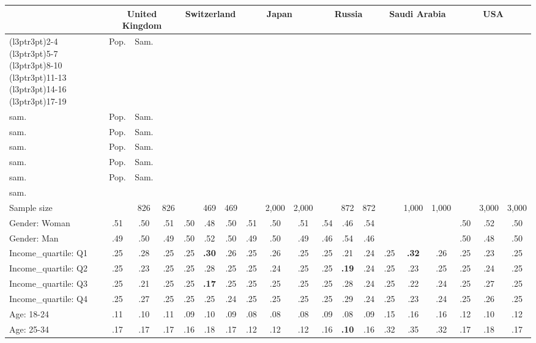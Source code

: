
\begin{tabular}[t]{lcccccccccccccccccc}
\toprule
\multicolumn{1}{c}{} & \multicolumn{3}{c}{United Kingdom} & \multicolumn{3}{c}{Switzerland} & \multicolumn{3}{c}{Japan} & \multicolumn{3}{c}{Russia} & \multicolumn{3}{c}{Saudi Arabia} & \multicolumn{3}{c}{USA} \\
\cmidrule(l{3pt}r{3pt}){2-4} \cmidrule(l{3pt}r{3pt}){5-7} \cmidrule(l{3pt}r{3pt}){8-10} \cmidrule(l{3pt}r{3pt}){11-13} \cmidrule(l{3pt}r{3pt}){14-16} \cmidrule(l{3pt}r{3pt}){17-19}
  & Pop. & Sam. & \makecell{Wght.\\sam.} & Pop. & Sam. & \makecell{Wght.\\sam.} & Pop. & Sam. & \makecell{Wght.\\sam.} & Pop. & Sam. & \makecell{Wght.\\sam.} & Pop. & Sam. & \makecell{Wght.\\sam.} & Pop. & Sam. & \makecell{Wght.\\sam.}\\
\midrule
Sample size &  & 826 & 826 &  & 469 & 469 &  & 2,000 & 2,000 &  & 872 & 872 &  & 1,000 & 1,000 &  & 3,000 & 3,000\\
\addlinespace
Gender: Woman & .51 & .50 & .51 & .50 & .48 & .50 & .51 & .50 & .51 & .54 & .46 & .54 &  &  &  & .50 & .52 & .50\\
Gender: Man & .49 & .50 & .49 & .50 & .52 & .50 & .49 & .50 & .49 & .46 & .54 & .46 &  &  &  & .50 & .48 & .50\\
\addlinespace
Income\_quartile: Q1 & .25 & .28 & .25 & .25 & \textbf{.30} & .26 & .25 & .26 & .25 & .25 & .21 & .24 & .25 & \textbf{.32} & .26 & .25 & .23 & .25\\
Income\_quartile: Q2 & .25 & .23 & .25 & .25 & .28 & .25 & .25 & .24 & .25 & .25 & \textbf{.19} & .24 & .25 & .23 & .25 & .25 & .24 & .25\\
Income\_quartile: Q3 & .25 & .21 & .25 & .25 & \textbf{.17} & .25 & .25 & .25 & .25 & .25 & .28 & .24 & .25 & .22 & .24 & .25 & .27 & .25\\
Income\_quartile: Q4 & .25 & .27 & .25 & .25 & .25 & .24 & .25 & .25 & .25 & .25 & .29 & .24 & .25 & .23 & .24 & .25 & .26 & .25\\
\addlinespace
Age: 18-24 & .11 & .10 & .11 & .09 & .10 & .09 & .08 & .08 & .08 & .09 & .08 & .09 & .15 & .16 & .16 & .12 & .10 & .12\\
Age: 25-34 & .17 & .17 & .17 & .16 & .18 & .17 & .12 & .12 & .12 & .16 & \textbf{.10} & .16 & .32 & .35 & .32 & .17 & .18 & .17\\

\end{tabular}
